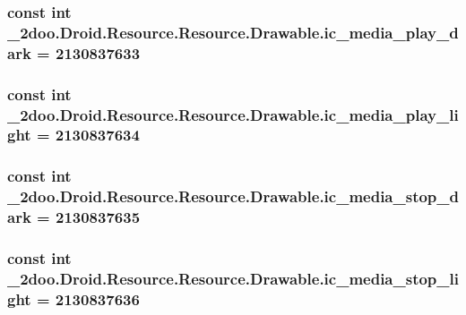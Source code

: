 \hypertarget{class__2doo_1_1_droid_1_1_resource_1_1_drawable_0c6ac00603b6deb96f8feb473de048ba}{
\subsubsection[{ic\_\-media\_\-play\_\-dark}]{\setlength{\rightskip}{0pt plus 5cm}const int \_\-2doo.Droid.Resource.Resource.Drawable.ic\_\-media\_\-play\_\-dark = 2130837633}}
\label{class__2doo_1_1_droid_1_1_resource_1_1_drawable_0c6ac00603b6deb96f8feb473de048ba}


\hypertarget{class__2doo_1_1_droid_1_1_resource_1_1_drawable_c653fdb30d696eb8d17d5ca1efd9a503}{
\subsubsection[{ic\_\-media\_\-play\_\-light}]{\setlength{\rightskip}{0pt plus 5cm}const int \_\-2doo.Droid.Resource.Resource.Drawable.ic\_\-media\_\-play\_\-light = 2130837634}}
\label{class__2doo_1_1_droid_1_1_resource_1_1_drawable_c653fdb30d696eb8d17d5ca1efd9a503}


\hypertarget{class__2doo_1_1_droid_1_1_resource_1_1_drawable_6b55e6966090170f9224a277ba1c7e25}{
\subsubsection[{ic\_\-media\_\-stop\_\-dark}]{\setlength{\rightskip}{0pt plus 5cm}const int \_\-2doo.Droid.Resource.Resource.Drawable.ic\_\-media\_\-stop\_\-dark = 2130837635}}
\label{class__2doo_1_1_droid_1_1_resource_1_1_drawable_6b55e6966090170f9224a277ba1c7e25}


\hypertarget{class__2doo_1_1_droid_1_1_resource_1_1_drawable_dab161de5258746bf2935559dfb83c4d}{
\subsubsection[{ic\_\-media\_\-stop\_\-light}]{\setlength{\rightskip}{0pt plus 5cm}const int \_\-2doo.Droid.Resource.Resource.Drawable.ic\_\-media\_\-stop\_\-light = 2130837636}}
\label{class__2doo_1_1_droid_1_1_resource_1_1_drawable_dab161de5258746bf2935559dfb83c4d}


